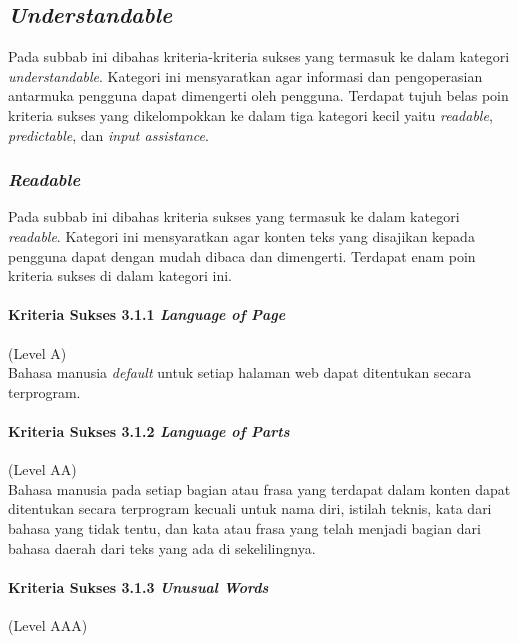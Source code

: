 \subsection{\textit{Understandable}}
\label{sec:understandable}
Pada subbab ini dibahas kriteria-kriteria sukses yang termasuk ke dalam kategori \textit{understandable}. Kategori ini mensyaratkan agar informasi dan pengoperasian antarmuka pengguna dapat dimengerti oleh pengguna. Terdapat tujuh belas poin kriteria sukses yang dikelompokkan ke dalam tiga kategori kecil yaitu \textit{readable}, \textit{predictable}, dan \textit{input assistance}.

\subsubsection{\textit{Readable}}
\label{sec:readable}
Pada subbab ini dibahas kriteria sukses yang termasuk ke dalam kategori \textit{readable}. Kategori ini mensyaratkan agar konten teks yang disajikan kepada pengguna dapat dengan mudah dibaca dan dimengerti. Terdapat enam poin kriteria sukses di dalam kategori ini.

\paragraph{Kriteria Sukses 3.1.1 \textit{Language of Page}}
\label{sec:kriteria_sukses_3.1.1}
(Level A)\\

Bahasa manusia \textit{default} untuk setiap halaman web dapat ditentukan secara terprogram.

\paragraph{Kriteria Sukses 3.1.2 \textit{Language of Parts}}
\label{sec:kriteria_sukses_3.1.2}
(Level AA)\\

Bahasa manusia pada setiap bagian atau frasa yang terdapat dalam konten dapat ditentukan secara terprogram kecuali untuk nama diri, istilah teknis, kata dari bahasa yang tidak tentu, dan kata atau frasa yang telah menjadi bagian dari bahasa daerah dari teks yang ada di sekelilingnya.

\paragraph{Kriteria Sukses 3.1.3 \textit{Unusual Words}}
\label{sec:kriteria_sukses_3.1.3}
(Level AAA)\\

